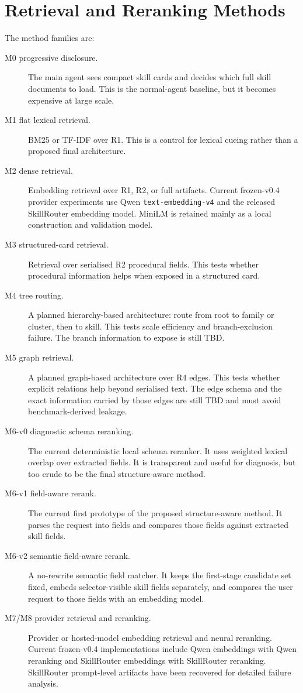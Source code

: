 \section{Retrieval and Reranking Methods}

The method families are:

\begin{description}
  \item[M0 progressive disclosure.] The main agent sees compact skill cards and decides which full skill documents to load. This is the normal-agent baseline, but it becomes expensive at large scale.
  \item[M1 flat lexical retrieval.] BM25 or TF-IDF over R1. This is a control for lexical cueing rather than a proposed final architecture.
  \item[M2 dense retrieval.] Embedding retrieval over R1, R2, or full artifacts. Current frozen-v0.4 provider experiments use Qwen \texttt{text-embedding-v4} and the released SkillRouter embedding model. MiniLM is retained mainly as a local construction and validation model.
  \item[M3 structured-card retrieval.] Retrieval over serialised R2 procedural fields. This tests whether procedural information helps when exposed in a structured card.
  \item[M4 tree routing.] A planned hierarchy-based architecture: route from root to family or cluster, then to skill. This tests scale efficiency and branch-exclusion failure. The branch information to expose is still TBD.
  \item[M5 graph retrieval.] A planned graph-based architecture over R4 edges. This tests whether explicit relations help beyond serialised text. The edge schema and the exact information carried by those edges are still TBD and must avoid benchmark-derived leakage.
  \item[M6-v0 diagnostic schema reranking.] The current deterministic local schema reranker. It uses weighted lexical overlap over extracted fields. It is transparent and useful for diagnosis, but too crude to be the final structure-aware method.
  \item[M6-v1 field-aware rerank.] The current first prototype of the proposed structure-aware method. It parses the request into fields and compares those fields against extracted skill fields.
  \item[M6-v2 semantic field-aware rerank.] A no-rewrite semantic field matcher. It keeps the first-stage candidate set fixed, embeds selector-visible skill fields separately, and compares the user request to those fields with an embedding model.
  \item[M7/M8 provider retrieval and reranking.] Provider or hosted-model embedding retrieval and neural reranking. Current frozen-v0.4 implementations include Qwen embeddings with Qwen reranking and SkillRouter embeddings with SkillRouter reranking. SkillRouter prompt-level artifacts have been recovered for detailed failure analysis.
\end{description}

